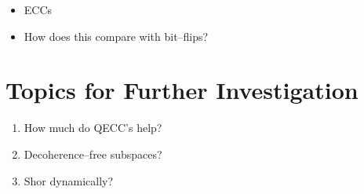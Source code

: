 \begin{itemize}
\item ECCs
\item How does this compare with bit--flips?
\end{itemize}

\section{Topics for Further Investigation}

\begin{enumerate}
\item How much do QECC's help?
\item Decoherence--free subspaces?
\item Shor dynamically?
\end{enumerate}

